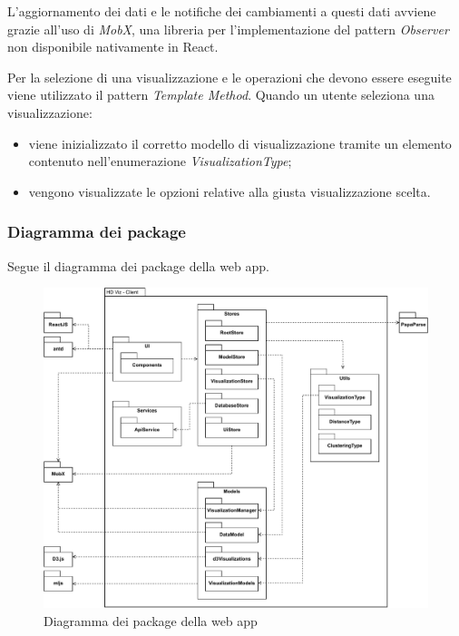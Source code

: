     L'aggiornamento dei dati e le notifiche dei cambiamenti a questi dati avviene grazie all'uso di \emph{MobX}, una libreria per l'implementazione del pattern \emph{Observer} non disponibile nativamente in React.
    
    Per la selezione di una visualizzazione e le operazioni che devono essere eseguite viene utilizzato il pattern \emph{Template Method}.
    Quando un utente seleziona una visualizzazione:
    \begin{itemize}
        \item viene inizializzato il corretto modello di visualizzazione tramite un elemento contenuto nell'enumerazione \emph{VisualizationType};
        \item vengono visualizzate le opzioni relative alla giusta visualizzazione scelta.
    \end{itemize}
    
    \pagebreak
    
    \subsubsection{Diagramma dei package}
    Segue il diagramma dei package della web app.
    
    \begin{figure}[htbp]
        \centering
        \includegraphics[width=1\textwidth]{source/img/package.pdf}
        \caption{Diagramma dei package della web app}
    \end{figure}
    
